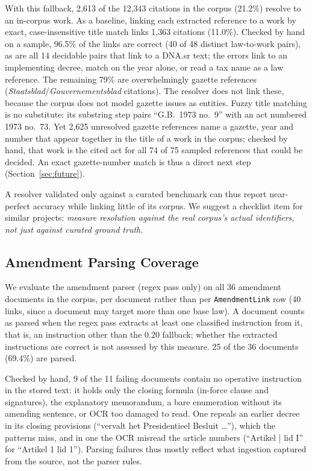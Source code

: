 \documentclass{IOS-Book-Article}
\begin{document}
With this fallback, 2,613 of the 12,343 citations in the corpus (21.2\%)
resolve to an in-corpus work. As a baseline, linking each extracted
reference to a work by exact, case-insensitive title match links 1,363 citations (11.0\%).
Checked by hand on a sample, 96.5\% of the links are correct (40 of 48 distinct law-to-work pairs), as are all 14 decidable pairs that link to a DNA.sr text; the
errors link to an implementing decree, match on the year alone, or read a tax name as a law
reference. The remaining 79\% are overwhelmingly gazette
references (\emph{Staatsblad}/\emph{Gouvernementsblad} citations). The resolver does not
link these, because the corpus does not model gazette issues as entities. Fuzzy title
matching is no substitute: its substring step pairs ``G.B.~1973 no.~9'' with an act numbered
1973 no.~73. Yet 2,625 unresolved gazette references name a gazette, year and number that
appear together in the title of a work in the corpus; checked by hand, that work is the cited
act for all 74 of 75 sampled references that could be decided. An exact gazette-number match
is thus a direct next step (Section~\ref{sec:future}).

A resolver validated only against a curated benchmark can thus report near-perfect accuracy
while linking little of its corpus. We suggest a checklist item for similar projects:
\emph{measure resolution against the real corpus's actual identifiers, not just against
curated ground truth.}

\subsection{Amendment Parsing Coverage}
\label{sec:parsing-eval}

We evaluate the amendment parser (regex pass only) on all 36 amendment documents in the
corpus, per document rather than per \texttt{AmendmentLink} row (40 links, since a document
may target more than one base law). A document counts as parsed when the regex pass extracts
at least one classified instruction from it, that is, an instruction other than the 0.20
fallback; whether the extracted instructions are correct is not assessed by this measure.
25 of the 36 documents (69.4\%) are parsed.

Checked by hand, 9 of the 11 failing documents contain no operative instruction in the stored
text: it holds only the closing formula (in-force clause and signatures), the explanatory
memorandum, a bare enumeration without its amending sentence, or OCR too damaged to read.
One repeals an earlier decree in its closing provisions (``vervalt het Presidentieel
Besluit \ldots''), which the patterns miss, and in one the OCR misread the article numbers
(``Artikel | lid I'' for ``Artikel 1 lid 1''). Parsing failures thus mostly reflect what
ingestion captured from the source, not the parser rules.
\end{document}
